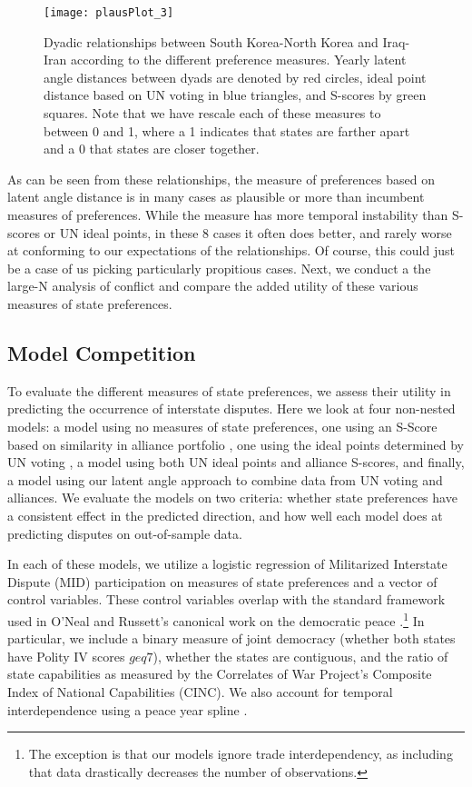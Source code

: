 \begin{figure}
	\centering
	\texttt{[image: plausPlot\_3]}
	\caption{Dyadic relationships between South Korea-North Korea and Iraq-Iran according to the different preference measures. Yearly latent angle distances between dyads are denoted by red circles, ideal point distance based on UN voting in blue triangles, and S-scores by green squares. Note that we have rescale each of these measures to between 0 and 1, where a 1 indicates that states are farther apart and a 0 that states are closer together.}
	\label{missing:dyads}
\end{figure}

As can be seen from these relationships, the measure of preferences based on latent angle distance is in many cases as plausible or more than incumbent measures of preferences. While the measure has more temporal instability than S-scores or UN ideal points, in these 8 cases it often does better, and rarely worse at conforming to our expectations of the relationships. Of course, this could just be a case of us picking particularly propitious cases. Next, we conduct a the large-N analysis of conflict and compare the added utility of these various measures of state preferences.

\subsection*{Model Competition}

To evaluate the different measures of state preferences, we assess their utility in predicting the occurrence of interstate disputes. Here we look at four non-nested models: a model using no measures of state preferences, one using an S-Score based on similarity in alliance portfolio \citep{signorino:ritter:1999}, one using the ideal points determined by UN voting \citep{bailey:etal:2015}, a model using both UN ideal points and alliance S-scores, and finally, a model using our latent angle approach to combine data from UN voting and alliances. We evaluate the models on two criteria: whether state preferences have a consistent effect in the predicted direction, and how well each model does at predicting disputes on out-of-sample data.

In each of these models, we utilize a logistic regression of Militarized Interstate Dispute (MID) participation on measures of state preferences and a vector of control variables. These control variables overlap with the standard framework used in O'Neal and Russett's canonical work on the democratic peace \citep{oneal:russett:1997}.\footnote{The exception is that our models ignore trade interdependency, as including that data drastically decreases the number of observations.} In particular, we include a binary measure of joint democracy (whether both states have Polity IV scores $geq 7$), whether the states are contiguous, and the ratio of state capabilities as measured by the Correlates of War Project's Composite Index of National Capabilities (CINC). We also account for temporal interdependence using a peace year spline \citep{carter:signorino:2010}. 

